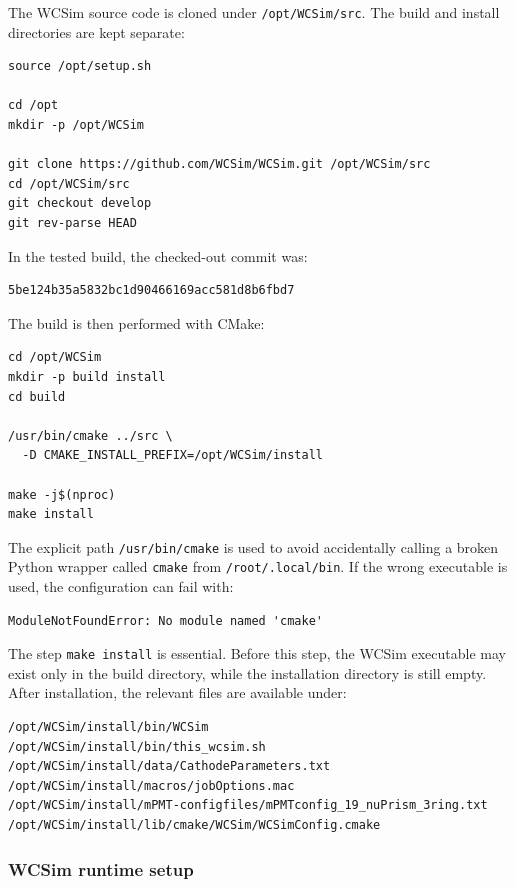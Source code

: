 \documentclass{article}
\numberwithin{table}{subsection}
\numberwithin{figure}{subsection}
\numberwithin{equation}{subsection}
\numberwithin{footnote}{subsection}
\begin{document}
The WCSim source code is cloned under \texttt{/opt/WCSim/src}. The build and install directories are kept separate:
\begin{lstlisting}[style=terminal]
source /opt/setup.sh

cd /opt
mkdir -p /opt/WCSim

git clone https://github.com/WCSim/WCSim.git /opt/WCSim/src
cd /opt/WCSim/src
git checkout develop
git rev-parse HEAD
\end{lstlisting}
In the tested build, the checked-out commit was:
\begin{lstlisting}[style=terminal]
5be124b35a5832bc1d90466169acc581d8b6fbd7
\end{lstlisting}
The build is then performed with CMake:
\begin{lstlisting}[style=terminal]
cd /opt/WCSim
mkdir -p build install
cd build

/usr/bin/cmake ../src \
  -D CMAKE_INSTALL_PREFIX=/opt/WCSim/install

make -j$(nproc)
make install
\end{lstlisting}
The explicit path \texttt{/usr/bin/cmake} is used to avoid accidentally calling a broken Python wrapper called \texttt{cmake} from \texttt{/root/.local/bin}. If the wrong executable is used, the configuration can fail with:
\begin{lstlisting}[style=terminal]
ModuleNotFoundError: No module named 'cmake'
\end{lstlisting}
The step \texttt{make install} is essential. Before this step, the WCSim executable may exist only in the build directory, while the installation directory is still empty. After installation, the relevant files are available under:
\begin{lstlisting}[style=terminal]
/opt/WCSim/install/bin/WCSim
/opt/WCSim/install/bin/this_wcsim.sh
/opt/WCSim/install/data/CathodeParameters.txt
/opt/WCSim/install/macros/jobOptions.mac
/opt/WCSim/install/mPMT-configfiles/mPMTconfig_19_nuPrism_3ring.txt
/opt/WCSim/install/lib/cmake/WCSim/WCSimConfig.cmake
\end{lstlisting}

\subsubsection{WCSim runtime setup}
\label{subsec:wcsim_runtime_setup}
\end{document}
